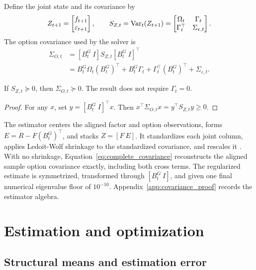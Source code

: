 Define the joint state and its covariance by
\begin{equation}
  Z_{t+1}=\begin{bmatrix}f_{t+1}\\ \varepsilon_{t+1}\end{bmatrix},
  \qquad
  S_{Z,t}=\operatorname{Var}_t(Z_{t+1})=
  \begin{bmatrix}
    \Omega_t&\Gamma_t\\
    \Gamma_t^\top&\Sigma_{\varepsilon,t}
  \end{bmatrix}.
  \label{eq:joint_covariance}
\end{equation}
The option covariance used by the solver is
\begin{align}
  \Sigma_{O,t}
  &=[B^G_t\ I]S_{Z,t}[B^G_t\ I]^\top \label{eq:complete_covariance}\\
  &=B^G_t\Omega_t(B^G_t)^\top+B^G_t\Gamma_t
    +\Gamma_t^\top(B^G_t)^\top+\Sigma_{\varepsilon,t}. \nonumber
\end{align}

\begin{proposition}
If \(S_{Z,t}\succeq0\), then \(\Sigma_{O,t}\succeq0\). The result does not require
\(\Gamma_t=0\).
\end{proposition}
\begin{proof}
For any \(x\), set \(y=[B^G_t\ I]^\top x\). Then
\(x^\top\Sigma_{O,t}x=y^\top S_{Z,t}y\ge0\).
\end{proof}

The estimator centers the aligned factor and option observations, forms
\(E=R-F(B^G_t)^\top\), and stacks \(Z=[F\ E]\). It standardizes each joint column,
applies Ledoit-Wolf shrinkage to the standardized covariance, and rescales it
\citep{ledoitwolf2004}. With no shrinkage, Equation~\eqref{eq:complete_covariance}
reconstructs the aligned sample option covariance exactly, including both cross terms.
The regularized estimate is symmetrized, transformed through \([B^G_t\ I]\), and given
one final numerical eigenvalue floor of \(10^{-10}\). Appendix~\ref{app:covariance_proof}
records the estimator algebra.

\section{Estimation and optimization}

\subsection{Structural means and estimation error}

